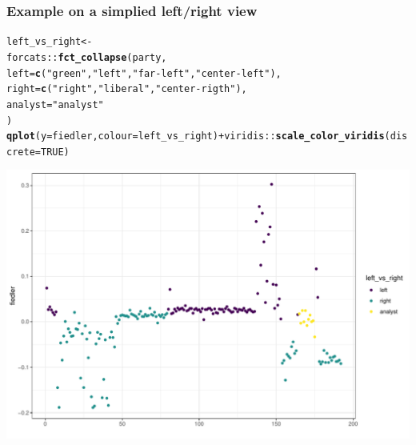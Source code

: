 \documentclass{beamer}\usepackage[]{graphicx}\usepackage[]{color}
\makeatletter
\newcommand{\hlnum}[1]{\textcolor[rgb]{0.686,0.059,0.569}{#1}}%
\newcommand{\hlstr}[1]{\textcolor[rgb]{0.192,0.494,0.8}{#1}}%
\newcommand{\hlopt}[1]{\textcolor[rgb]{0,0,0}{#1}}%
\newcommand{\hlstd}[1]{\textcolor[rgb]{0.345,0.345,0.345}{#1}}%
\newcommand{\hlkwb}[1]{\textcolor[rgb]{0.69,0.353,0.396}{#1}}%
\newcommand{\hlkwc}[1]{\textcolor[rgb]{0.333,0.667,0.333}{#1}}%
\newcommand{\hlkwd}[1]{\textcolor[rgb]{0.737,0.353,0.396}{\textbf{#1}}}%
\newenvironment{kframe}{%
 \def\at@end@of@kframe{}%
 \ifinner\ifhmode%
  \def\at@end@of@kframe{\end{minipage}}%
  \begin{minipage}{\columnwidth}%
 \fi\fi%
 \def\FrameCommand##1{\hskip\@totalleftmargin \hskip-\fboxsep
 \colorbox{shadecolor}{##1}\hskip-\fboxsep
     \hskip-\linewidth \hskip-\@totalleftmargin \hskip\columnwidth}%
 \MakeFramed {\advance\hsize-\width
   \@totalleftmargin\z@ \linewidth\hsize
   \@setminipage}}%
 {\par\unskip\endMakeFramed%
 \at@end@of@kframe}
\newenvironment{knitrout}{}{} %
\makeatother
\begin{document}
\begin{frame}[fragile]
  \frametitle{Example on a simplied left/right view}

\begin{knitrout}\scriptsize
{}\color{fgcolor}\begin{kframe}
\begin{alltt}
\hlstd{left_vs_right} \hlkwb{<-}
  \hlstd{forcats}\hlopt{::}\hlkwd{fct_collapse}\hlstd{(party,}
    \hlkwc{left} \hlstd{=} \hlkwd{c}\hlstd{(}\hlstr{"green"}\hlstd{,} \hlstr{"left"}\hlstd{,} \hlstr{"far-left"}\hlstd{,} \hlstr{"center-left"}\hlstd{),}
    \hlkwc{right} \hlstd{=} \hlkwd{c}\hlstd{(}\hlstr{"right"}\hlstd{,} \hlstr{"liberal"}\hlstd{,} \hlstr{"center-rigth"}\hlstd{),}
    \hlkwc{analyst} \hlstd{=} \hlstr{"analyst"}
  \hlstd{)}
\hlkwd{qplot}\hlstd{(}\hlkwc{y} \hlstd{= fiedler,} \hlkwc{colour} \hlstd{= left_vs_right)} \hlopt{+}  \hlstd{viridis}\hlopt{::}\hlkwd{scale_color_viridis}\hlstd{(}\hlkwc{discrete} \hlstd{=} \hlnum{TRUE}\hlstd{)}
\end{alltt}
\end{kframe}
\includegraphics[width=.8\textwidth]{figures/unnamed-chunk-7-1} 
\end{knitrout}


\end{frame}
\end{document}

